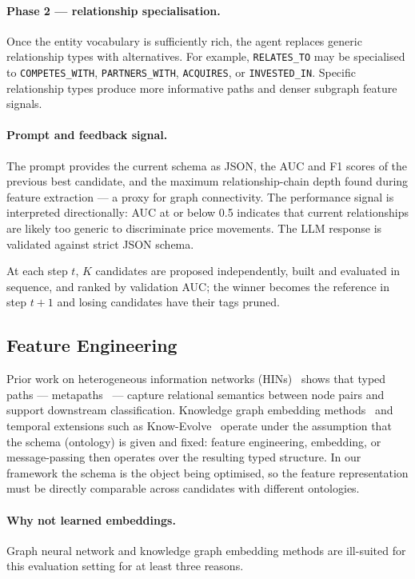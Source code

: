 \paragraph{Phase 2 --- relationship specialisation.}
Once the entity vocabulary is sufficiently rich, the agent replaces generic relationship types with alternatives.
For example, \texttt{RELATES\_TO} may be specialised to \texttt{COMPETES\_WITH},
\texttt{PARTNERS\_WITH}, \texttt{ACQUIRES}, or \texttt{INVESTED\_IN}.
Specific relationship types produce more informative paths and denser subgraph feature signals.

\paragraph{Prompt and feedback signal.}
The prompt provides the current schema as JSON, the AUC and F1 scores of the previous best
candidate, and the maximum relationship-chain depth found during feature extraction --- a proxy for
graph connectivity.
The performance signal is interpreted directionally: AUC at or below 0.5 indicates that current
relationships are likely too generic to discriminate price movements.
The LLM response is validated against strict JSON schema.

At each step $t$, $K$ candidates are proposed independently, built and evaluated in sequence, and
ranked by validation AUC; the winner becomes the reference in step $t+1$ and losing candidates have their tags pruned.

\subsection{Feature Engineering}
\label{sec:features}

Prior work on heterogeneous information networks (HINs)~\citep{shi2017surveyhin} shows that typed
paths --- metapaths~\citep{sun2011pathsim, dong2017metapath2vec} --- capture relational semantics
between node pairs and support downstream classification.
Knowledge graph embedding methods~\citep{wang2017kgsurvey, ji2021kgcompletion} and temporal
extensions such as Know-Evolve~\citep{trivedi2017knowledevolution} operate under the assumption
that the schema (ontology) is given and fixed: feature engineering, embedding, or message-passing then
operates over the resulting typed structure.
In our framework the schema is the object being optimised, so the feature representation must be directly comparable across candidates with different ontologies.

\paragraph{Why not learned embeddings.}
Graph neural network and knowledge graph embedding methods are ill-suited for this evaluation
setting for at least three reasons.

